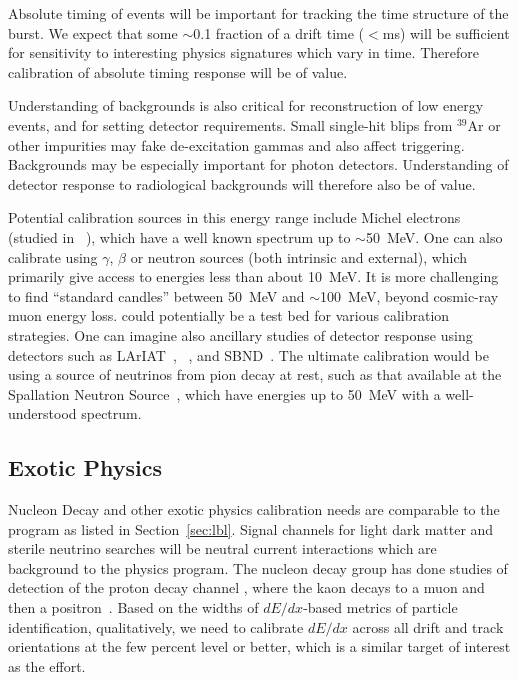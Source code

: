 Absolute timing of events will be important for tracking the time structure of the burst. We expect that some $\sim$\num{0.1} fraction of a drift time ($<$\si{\ms}) will be sufficient for sensitivity to interesting physics signatures which vary in time. Therefore calibration of absolute timing response will be of value.

Understanding of backgrounds is also critical for reconstruction of low energy events, and for setting detector requirements. Small single-hit blips from $^{39}$Ar or other impurities may fake de-excitation gammas and also affect triggering. Backgrounds may be especially important for photon detectors.  Understanding of detector response to radiological backgrounds will therefore also be of value.

Potential calibration sources in this energy range include Michel electrons (studied in ~\cite{Acciarri:2017sjy}), which have a well known spectrum up to $\sim$50~MeV. One can also calibrate using $\gamma$, $\beta$ or neutron sources (both intrinsic and external), which primarily give access to energies less than about 10~MeV. It is more challenging to find ``standard candles'' between 50~MeV and $\sim$\SI{100}{\MeV}, beyond cosmic-ray muon energy loss.  could potentially be a test bed for various calibration strategies. One can imagine also ancillary studies of detector response using detectors such as LArIAT~\cite{Cavanna:2014iqa}, ~\cite{Acciarri:2016smi}, and SBND~\cite{Antonello:2015lea}. The ultimate calibration would be using a source of neutrinos from pion decay at rest, such as that available at the Spallation Neutron Source~\cite{Bolozdynya:2012xv}, which have energies up to \SI{50}{\MeV} with a well-understood spectrum.

\subsection{Exotic Physics}\label{sec:exotica}

Nucleon Decay and other exotic physics calibration needs are comparable to the  program as listed in Section~\ref{sec:lbl}. Signal channels for light dark matter and sterile neutrino searches will be neutral current interactions which are background to the  physics program. The nucleon decay group has done studies of detection of the proton decay channel \ptoknubar, %
where the kaon decays to a muon and then a positron~\cite{ty:protondecaywidths}. Based on the widths of $dE/dx$-based metrics of particle identification, qualitatively, we need to calibrate $dE/dx$ across all drift and track orientations at the few percent level or better, which is a similar target of interest as the  effort.

